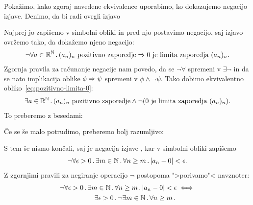 \begin{zgled}
  Pokažimo, kako zgoraj navedene ekvivalence uporabimo, ko dokazujemo negacijo izjave.
  Denimo, da bi radi ovrgli izjavo
  \begin{quote}
  \end{quote}
  Najprej jo zapišemo v simbolni obliki in pred njo postavimo negacijo, saj izjavo ovržemo tako, da dokažemo njeno negacijo:
  \begin{equation}
    \label{eq:pozitivno-limita-0}
    \neg \forall a \in \mathbb{R}^{\mathbb{N}} \,.\,{\text{$(a_n)_n$ pozitivno zaporedje}
      \Rightarrow \text{$0$ je limita zaporedja $(a_n)_n$}}.
  \end{equation}
  Zgornja pravila za računanje negacije nam povedo, da se
  $\lnot\forall$ spremeni v $\exists\lnot$ in da se nato implikacija
  oblike $\phi \Rightarrow \psi$ spremeni v $\phi \land \lnot\psi$. Tako
  dobimo ekvivalentno obliko~\eqref{eq:pozitivno-limita-0}:
  \begin{equation*}
    \exists a \in \mathbb{R}^{\mathbb{N}} \,.\,{\text{$(a_n)_n$ pozitivno zaporedje}
      \land \lnot (\text{$0$ je limita zaporedja $(a_n)_n$})}.
  \end{equation*}
  To preberemo z besedami:
  \begin{quote}
  \end{quote}
  Če se še malo potrudimo, preberemo bolj razumljivo:
  \begin{quote}
  \end{quote}
  S tem še nismo končali, saj je  negacija izjave , kar v simbolni obliki zapišemo
  \begin{equation}
    \label{eq:limita-0}
    \neg \forall \epsilon > 0 \,.\,
      \exists m \in \mathbb{N} \,.\,
        \forall n \geq m \,.\,
          |a_n - 0| < \epsilon.
  \end{equation}
  Z zgornjimi pravili za negiranje operacijo $\lnot$ postopoma ">porivamo"<
  navznoter:
  \begin{align*}
    \lnot \all{\epsilon > 0} \some{m \in \NN} \all{n \geq m} |a_n
          - 0| < \epsilon & \iff
    \\
    \some{\epsilon > 0} \lnot \some{m \in \NN} \all{n \geq m}

\end{align*}
\end{zgled}

